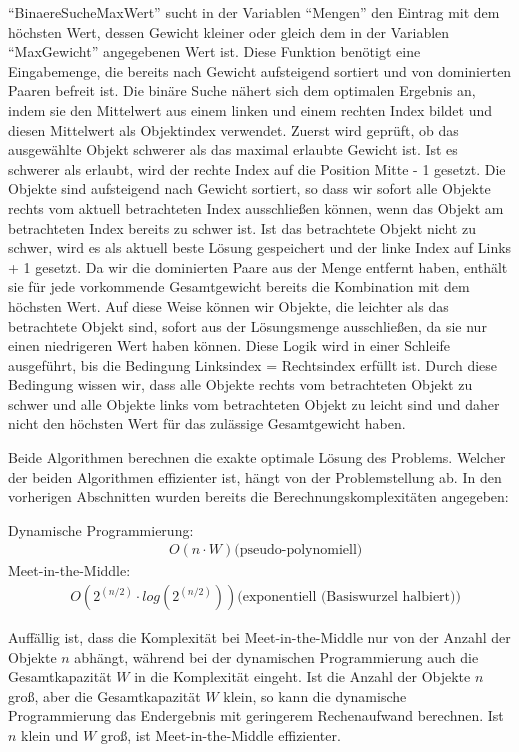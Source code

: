\enquote{BinaereSucheMaxWert} sucht in der Variablen \enquote{Mengen} den Eintrag mit dem höchsten Wert, dessen Gewicht kleiner oder gleich dem in der Variablen \enquote{MaxGewicht} angegebenen Wert ist. Diese Funktion benötigt eine Eingabemenge, die bereits nach Gewicht aufsteigend sortiert und von dominierten Paaren befreit ist. Die binäre Suche nähert sich dem optimalen Ergebnis an, indem sie den Mittelwert aus einem linken und einem rechten Index bildet und diesen Mittelwert als Objektindex verwendet. Zuerst wird geprüft, ob das ausgewählte Objekt schwerer als das maximal erlaubte Gewicht ist. Ist es schwerer als erlaubt, wird der rechte Index auf die Position Mitte - 1 gesetzt. Die Objekte sind aufsteigend nach Gewicht sortiert, so dass wir sofort alle Objekte rechts vom aktuell betrachteten Index ausschließen können, wenn das Objekt am betrachteten Index bereits zu schwer ist. Ist das betrachtete Objekt nicht zu schwer, wird es als aktuell beste Lösung gespeichert und der linke Index auf Links + 1 gesetzt. Da wir die dominierten Paare aus der Menge entfernt haben, enthält sie für jede vorkommende Gesamtgewicht bereits die Kombination mit dem höchsten Wert. Auf diese Weise können wir Objekte, die leichter als das betrachtete Objekt sind, sofort aus der Lösungsmenge ausschließen, da sie nur einen niedrigeren Wert haben können. Diese Logik wird in einer Schleife ausgeführt, bis die Bedingung Linksindex = Rechtsindex erfüllt ist. Durch diese Bedingung wissen wir, dass alle Objekte rechts vom betrachteten Objekt zu schwer und alle Objekte links vom betrachteten Objekt zu leicht sind und daher nicht den höchsten Wert für das zulässige Gesamtgewicht haben.

Beide Algorithmen berechnen die exakte optimale Lösung des Problems. Welcher der beiden Algorithmen effizienter ist, hängt von der Problemstellung ab. In den vorherigen Abschnitten wurden bereits die Berechnungskomplexitäten angegeben:


    Dynamische Programmierung: \\
\begin{align}
    & O(n \cdot W) \text{(pseudo-polynomiell)}
    \label{EQ:DP}
\end{align}
    Meet-in-the-Middle: \\
\begin{align}
    & O(2^{(n/2)} \cdot log(2^{(n/2)})) \text{(exponentiell (Basiswurzel halbiert))}
    \label{EQ:MitM}
\end{align}

Auffällig ist, dass die Komplexität bei Meet-in-the-Middle nur von der Anzahl der Objekte $ n $ abhängt, während bei der dynamischen Programmierung auch die Gesamtkapazität $ W $ in die Komplexität eingeht. Ist die Anzahl der Objekte $ n $ groß, aber die Gesamtkapazität $ W $ klein, so kann die dynamische Programmierung das Endergebnis mit geringerem Rechenaufwand berechnen. Ist $ n $ klein und $ W $ groß, ist Meet-in-the-Middle effizienter.

